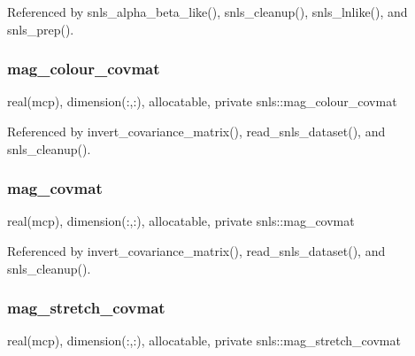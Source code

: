 Referenced by snls\+\_\+alpha\+\_\+beta\+\_\+like(), snls\+\_\+cleanup(), snls\+\_\+lnlike(), and snls\+\_\+prep().

\mbox{\label{namespacesnls_a0579d76af88ce5be98b90af1b8d09b20}} 
\subsubsection{\texorpdfstring{mag\+\_\+colour\+\_\+covmat}{mag\_colour\_covmat}}
{\footnotesize\ttfamily real(mcp), dimension(\+:,\+:), allocatable, private snls\+::mag\+\_\+colour\+\_\+covmat\hspace{0.3cm}{\ttfamily [private]}}



Referenced by invert\+\_\+covariance\+\_\+matrix(), read\+\_\+snls\+\_\+dataset(), and snls\+\_\+cleanup().

\mbox{\label{namespacesnls_a0dc9a08e398ee49bd864a8d88d95f195}} 
\subsubsection{\texorpdfstring{mag\+\_\+covmat}{mag\_covmat}}
{\footnotesize\ttfamily real(mcp), dimension(\+:,\+:), allocatable, private snls\+::mag\+\_\+covmat\hspace{0.3cm}{\ttfamily [private]}}



Referenced by invert\+\_\+covariance\+\_\+matrix(), read\+\_\+snls\+\_\+dataset(), and snls\+\_\+cleanup().

\mbox{\label{namespacesnls_a5ed1dbc069e004d9de1dd21d5c7786bc}} 
\subsubsection{\texorpdfstring{mag\+\_\+stretch\+\_\+covmat}{mag\_stretch\_covmat}}
{\footnotesize\ttfamily real(mcp), dimension(\+:,\+:), allocatable, private snls\+::mag\+\_\+stretch\+\_\+covmat\hspace{0.3cm}{\ttfamily [private]}}



